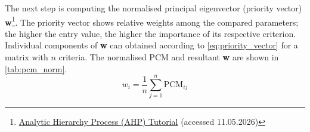 The next step is computing the normalised principal eigenvector (priority vector) \textbf{w}\footnote{\href{https://people.revoledu.com/kardi/tutorial/AHP}{Analytic Hierarchy Process (AHP) Tutorial} (accessed 11.05.2026)}. The priority vector shows relative weights among the compared parameters; the higher the entry value, the higher the importance of its respective criterion.  Individual components of \textbf{w} can obtained according to \autoref{eq:priority_vector} for a matrix with $n$ criteria. The normalised PCM and resultant \textbf{w} are shown in \autoref{tab:pcm_norm}.
\begin{equation}
    \label{eq:priority_vector}
    w_i=\frac{1}{n}\sum^{n}_{j=1}\text{PCM}_{ij}
\end{equation}


